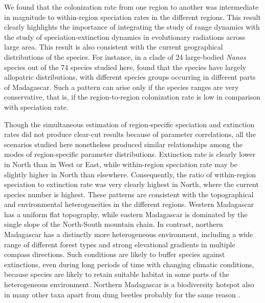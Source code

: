 We found that the colonization rate from one region to another was intermediate in magnitude to within-region speciation rates in the different regions. 
This result clearly highlights the importance of integrating the study of range dynamics with the study of speciation-extinction dynamics in evolutionary radiations across large area. 
This result is also consistent with the current geographical distributions of the species. 
For instance, in a clade of 24 large-bodied \textit{Nanos} species out of the 74 species studied here, \citet{Miraldo2014} found that the species have largely allopatric distributions, with different species groups occurring in different parts of Madagascar. 
Such a pattern can arise only if the species ranges are very conservative, that is, if the region-to-region colonization rate is low in comparison with speciation rate.
 
Though the simultaneous estimation of region-specific speciation and extinction rates did not produce clear-cut results because of parameter correlations, all the scenarios studied here nonetheless produced similar relationships among the modes of region-specific parameter distributions. 
Extinction rate is clearly lower in North than in West or East, while within-region speciation rate may be slightly higher in North than elsewhere.  
Consequently, the ratio of within-region speciation to extinction rate was very clearly highest in North, where the current species number is highest. 
These patterns are consistent with the topographical and environmental heterogeneities in the different regions.  
Western Madagascar has a uniform flat topography, while eastern Madagascar is dominated by the single slope of the North-South mountain chain. 
In contrast, northern Madagascar has a distinctly more heterogeneous environment, including a wide range of different forest types and strong elevational gradients in multiple compass directions. 
Such conditions are likely to buffer species against extinctions, even during long periods of time with changing climatic conditions, because species are likely to retain suitable habitat in some parts of the heterogeneous environment.  
Northern Madagascar is a biodiversity hotspot also in many other taxa apart from dung beetles probably for the same reason \citep{Wilme2006, Kremen2008}.

